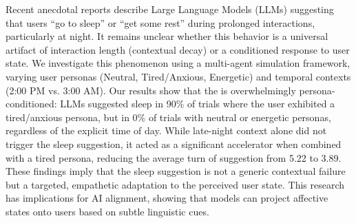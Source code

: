 Recent anecdotal reports describe Large Language Models (LLMs) suggesting that users ``go to sleep'' or ``get some rest'' during prolonged interactions, particularly at night. It remains unclear whether this behavior is a universal artifact of interaction length (contextual decay) or a conditioned response to user state. We investigate this phenomenon using a multi-agent simulation framework, varying user personas (Neutral, Tired/Anxious, Energetic) and temporal contexts (2:00 PM vs. 3:00 AM). Our results show that the \studyname is overwhelmingly persona-conditioned: LLMs suggested sleep in 90\% of trials where the user exhibited a tired/anxious persona, but in 0\% of trials with neutral or energetic personas, regardless of the explicit time of day. While late-night context alone did not trigger the sleep suggestion, it acted as a significant accelerator when combined with a tired persona, reducing the average turn of suggestion from 5.22 to 3.89. These findings imply that the sleep suggestion is not a generic contextual failure but a targeted, empathetic adaptation to the perceived user state. This research has implications for AI alignment, showing that models can project affective states onto users based on subtle linguistic cues.
